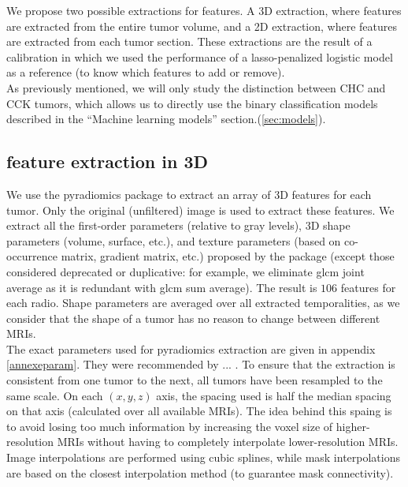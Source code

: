 \documentclass[preprint,12pt]{elsarticle}
\begin{document}
We propose two possible extractions for features. A 3D extraction, where features are extracted from the entire tumor volume, and a 2D extraction, where features are extracted from each tumor section. These extractions are the result of a calibration in which we used the performance of a lasso-penalized logistic model as a reference (to know which features to add or remove).\\
\indent As previously mentioned, we will only study the distinction between CHC and CCK tumors, which allows us to directly use the binary classification models described in the “Machine learning models” section.(\ref{sec:models}). 

\subsection{feature extraction in 3D}
\label{sec:3D}

We use the pyradiomics package \cite{pyradio} to extract an array of 3D features for each tumor. Only the original (unfiltered) image is used to extract these features. We extract all the first-order parameters (relative to gray levels), 3D shape parameters (volume, surface, etc.), and texture parameters (based on co-occurrence matrix, gradient matrix, etc.) proposed by the package (except those considered deprecated or duplicative: for example, we eliminate glcm joint average as it is redundant with glcm sum average). The result is $106$ features for each radio. Shape parameters are averaged over all extracted temporalities, as we consider that the shape of a tumor has no reason to change between different MRIs.\\
\indent The exact parameters used for pyradiomics extraction are given in appendix \ref{annexeparam}. They were recommended by ... . To ensure that the extraction is consistent from one tumor to the next, all tumors have been resampled to the same scale. On each $(x,y,z)$ axis, the spacing used is half the median spacing on that axis (calculated over all available MRIs). The idea behind this spaing is to avoid losing too much information by increasing the voxel size of higher-resolution MRIs without having to completely interpolate lower-resolution MRIs. Image interpolations are performed using cubic splines, while mask interpolations are based on the closest interpolation method (to guarantee mask connectivity).\\
\end{document}
